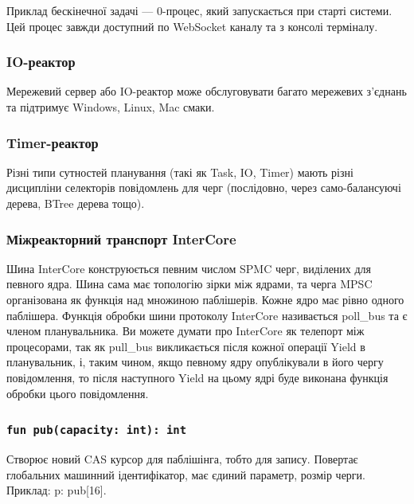 \documentclass{article}
\begin{document}
Приклад бескінечної задачі --- 0-процес,
який запускається при старті системи. Цей процес завжди доступний
по WebSocket каналу та з консолі терміналу.

\subsubsection*{IO-реактор}
Мережевий сервер або IO-реактор може обслуговувати багато
мережевих з'єднань та підтримує Windows, Linux, Mac смаки.

\subsubsection*{Timer-реактор}
Різні типи сутностей планування (такі як Task, IO, Timer)
мають різні дисципліни селекторів повідомлень для черг
(послідовно, через само-балансуючі дерева, BTree дерева тощо).

\subsubsection{Міжреакторний транспорт InterCore}
Шина InterCore конструюється певним числом SPMC черг, виділених для певного ядра.
Шина сама має топологію зірки між ядрами, та черга MPSC організована
як функція над множиною паблішерів. Кожне ядро має рівно одного паблішера.
Функція обробки шини протоколу InterCore називається poll\_bus та є членом планувальника.
Ви можете думати про InterCore як телепорт між процесорами, так як pull\_bus
викликається після кожної операції Yield в планувальник, і, таким чином,
якщо певному ядру опублікували в його чергу повідомлення, то після наступного Yield
на цьому ядрі буде виконана функція обробки цього повідомлення.

\subsubsection*{\lstinline{fun pub(capacity: int): int}}
Створює новий CAS курсор для паблішінга, тобто для запису.
Повертає глобальних машинний ідентифікатор, має єдиний параметр, розмір черги.
Приклад: p: pub[16].
\end{document}
